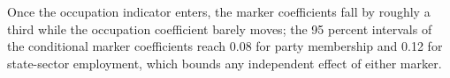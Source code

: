 Once the occupation indicator enters, the marker coefficients fall by roughly a third while the occupation coefficient barely moves; the 95 percent intervals of the conditional marker coefficients reach 0.08 for party membership and 0.12 for state-sector employment, which bounds any independent effect of either marker.%
